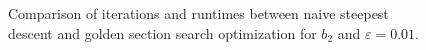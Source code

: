 \begin{figure}
\begin{center}
\end{center}
\caption{Comparison of iterations and runtimes between naive steepest descent and golden section search optimization for $b_2$ and $\varepsilon=0.01$.}\label{res_gss001d2}
\end{figure}

